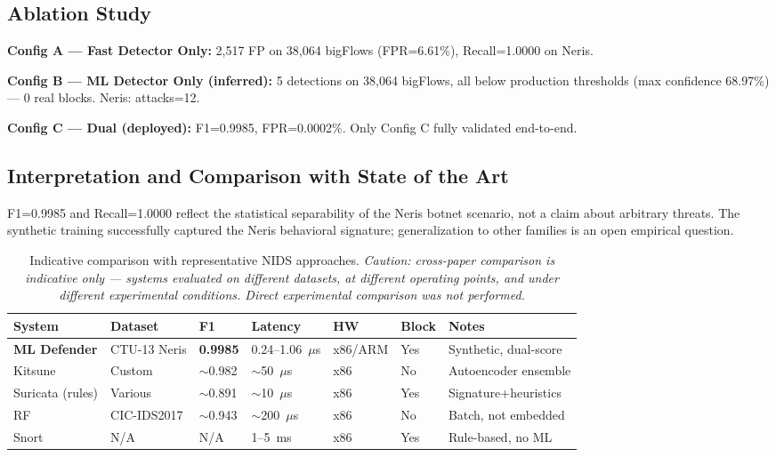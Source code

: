 \documentclass[11pt,a4paper]{article}
\begin{document}
\subsection{Ablation Study}
\label{sec:eval:ablation}

\textbf{Config A --- Fast Detector Only:} 2,517 FP on 38,064 bigFlows (FPR=6.61\%),
Recall=1.0000 on Neris.

\textbf{Config B --- ML Detector Only (inferred):} 5 detections on 38,064 bigFlows, all
below production thresholds (max confidence 68.97\%) --- 0 real blocks. Neris: attacks=12.

\textbf{Config C --- Dual (deployed):} F1=0.9985, FPR=0.0002\%. Only Config C fully
validated end-to-end.

\subsection{Interpretation and Comparison with State of the Art}

F1=0.9985 and Recall=1.0000 reflect the statistical separability of the Neris botnet
scenario, not a claim about arbitrary threats. The synthetic training successfully captured
the Neris behavioral signature; generalization to other families is an open empirical
question.

\begin{table}[h]
\centering
\footnotesize
\caption{Indicative comparison with representative NIDS approaches. \emph{Caution:
cross-paper comparison is indicative only --- systems evaluated on different datasets, at
different operating points, and under different experimental conditions. Direct experimental
comparison was not performed.}}
\label{tab:comparison}
\begin{tabular}{lllllll}
\toprule
\textbf{System} & \textbf{Dataset} & \textbf{F1} & \textbf{Latency} & \textbf{HW} & \textbf{Block} & \textbf{Notes} \\
\midrule
\textbf{ML Defender} & CTU-13 Neris & \textbf{0.9985} & 0.24--1.06~$\mu$s & x86/ARM & Yes & Synthetic, dual-score \\
Kitsune~\cite{mirsky2018} & Custom & ${\sim}$0.982 & ${\sim}$50~$\mu$s & x86 & No & Autoencoder ensemble \\
Suricata (rules) & Various & ${\sim}$0.891 & ${\sim}$10~$\mu$s & x86 & Yes & Signature+heuristics \\
RF~\cite{sharafaldin2018} & CIC-IDS2017 & ${\sim}$0.943 & ${\sim}$200~$\mu$s & x86 & No & Batch, not embedded \\
Snort & N/A & N/A & 1--5~ms & x86 & Yes & Rule-based, no ML \\
\bottomrule
\end{tabular}
\end{table}
\end{document}
